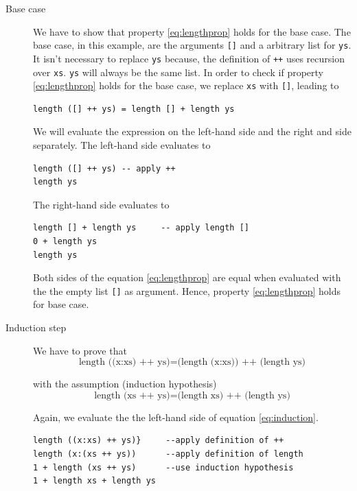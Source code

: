 \begin{description}
\item[Base case]
We have to show that property \ref{eq:lengthprop} holds for the base case. The base case, in this example, are the arguments \verb|[]| and a arbitrary list for \verb|ys|. It isn't necessary to replace \verb|ys| because, the definition of \verb|++| uses recursion over \verb|xs|. \verb|ys| will always be the same list.
In order to check if property \ref{eq:lengthprop} holds for the base case, we replace \verb|xs| with  \verb|[]|, leading to

\begin{verbatim}
length ([] ++ ys) = length [] + length ys
\end{verbatim}

We will evaluate the expression on the left-hand side and the right and side separately.
The left-hand side evaluates to

\begin{verbatim}
length ([] ++ ys) -- apply ++
length ys
\end{verbatim}

The right-hand side evaluates to 

\begin{verbatim}
length [] + length ys     -- apply length []
0 + length ys
length ys
\end{verbatim}

Both sides of the equation \ref{eq:lengthprop} are equal when evaluated with the the empty list \verb|[]| as argument. Hence, property \ref{eq:lengthprop} holds for base case.

\item[Induction step]
 We have to prove that
\begin{equation}
  \label{eq:induction}
    \text{length ((x:xs) ++ ys)} = \text{(length (x:xs)) ++ (length ys)}
\end{equation}

with the assumption (induction hypothesis)
\begin{equation}
  \label{eq:induction_hypothesis}
      \text{length (xs ++ ys)} = \text{(length xs) ++ (length ys)}
\end{equation}

Again, we evaluate the the left-hand side of equation \ref{eq:induction}.

\begin{program}
\begin{verbatim}
length ((x:xs) ++ ys)}     --apply definition of ++
length (x:(xs ++ ys))      --apply definition of length
1 + length (xs ++ ys)      --use induction hypothesis
1 + length xs + length ys
\end{verbatim}
\end{program}


\end{description}
